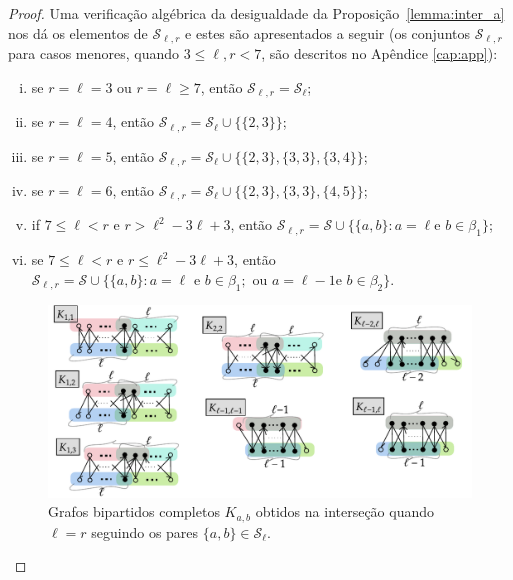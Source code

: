 \documentclass[12pt,a4paper]{book}
\begin{document}
\begin{proof}
    
    Uma verificação algébrica da desigualdade da Proposição~\ref{lemma:inter_a} nos dá os elementos de $\mathcal{S}_{\ell,r}$ e estes são apresentados a seguir (os conjuntos $\mathcal{S}_{\ell,r}$ para casos menores, quando $3 \leq \ell, r < 7$, são descritos no Apêndice \ref{cap:app}):
    
      \begin{enumerate}[(i)]
      \item \label{it:Si} se $r=\ell = 3$ ou $r=\ell \geq 7$, então
    $\mathcal{S}_{\ell,r} = \mathcal{S}_\ell$;
      \item  se $r=\ell = 4$, então $\mathcal{S}_{\ell,r} =
    \mathcal{S}_\ell \cup\big\{\{2,3\}\big\}$;
      \item se $r=\ell = 5$, então $\mathcal{S}_{\ell,r} =
    \mathcal{S}_\ell \cup\big\{\{2,3\},\{3,3\},\{3,4\}\big\}$;
      \item se $r=\ell = 6$, então $\mathcal{S}_{\ell,r} =
    \mathcal{S}_\ell \cup\big\{\{2,3\},\{3,3\},\{4,5\}\big\}$;
      \item \label{it:Sv} if $7 \leq \ell < r \text{ e } r > \ell^2-3\ell+3$,
    então $\mathcal{S}_{\ell,r} = \mathcal{S} \cup \{\{a,b\}: a=\ell\text{
    e }b\in \beta_1\}$;
       \item \label{it:Svi} se $7 \leq \ell < r \text{ e } r \leq
    \ell^2-3\ell+3$, então $\mathcal{S}_{\ell,r} = \mathcal{S} \cup
    \{\{a,b\}: a=\ell\text{ e }b\in \beta_1;\text{ ou }a=\ell-1\text{
    e }b\in \beta_2\}$.
      \end{enumerate}

     \begin{figure}[htb] \centering 
      \includegraphics[]{Kll-inter.pdf}
       \caption{Grafos bipartidos completos $K_{a,b}$ obtidos na interseção quando $\ell=r$ seguindo os pares $\{a,b\} \in\mathcal{S}_\ell$.}
       \label{fig:configKLL}
     \end{figure}


\end{proof}
\end{document}

